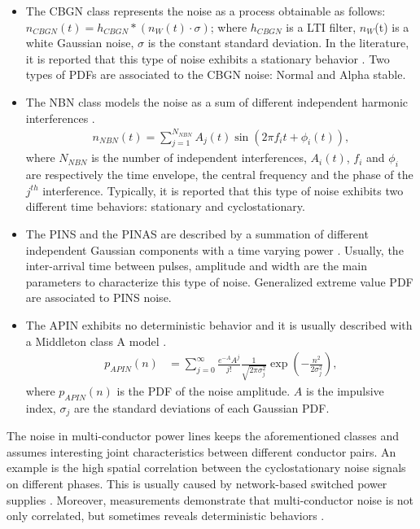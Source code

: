 \begin{itemize}

\item The CBGN class \cite{6288568} represents the noise as a process obtainable as follows: $n_{CBGN}(t) = h_{CBGN}* (n_W(t) \cdot \sigma)$;
where $h_{CBGN}$ is a LTI filter, $n_W$(t) is a white Gaussian noise, $\sigma$ is the constant standard deviation. In the literature, it is reported that this type of noise exhibits a stationary behavior \cite{1650328}. Two types of PDFs are associated to the CBGN noise: Normal and Alpha stable. 

\item The NBN class models the noise as a sum of different independent harmonic interferences \cite{5570980,7248409}. 
\begin{align}
n_{NBN}(t) = \sum_{j=1}^{N_{NBN}} A_j(t) \sin(2\pi f_it+\phi_i(t)),  
\label{eq:plc_nbn}
\end{align}
where $N_{NBN}$ is the number of independent interferences, $A_i(t)$, $f_i$ and $\phi_i$ are respectively the time envelope, the central frequency and the phase of the $j^{th}$ interference. 
Typically, it is reported that this type of noise exhibits two different time behaviors: stationary and cyclostationary. 

\item The PINS and the PINAS are described by a summation of different independent Gaussian components with a time varying power \cite{1650328,HanStoicaKaiser2016_1000056745}. Usually, the inter-arrival time between pulses, amplitude and width are the main parameters to characterize this type of noise. Generalized extreme value PDF are associated to PINS noise.

\item The APIN exhibits no deterministic behavior and it is usually described with a Middleton class A model \cite{4091283,6547827}. 
\begin{align}
p_{APIN}(n) &= \sum_{j=0}^{\infty} \frac{e^{-A}A^j}{j!} \frac{1}{\sqrt{2\pi \sigma^2_j}}\exp \left(-\frac{n^2}{2\sigma^2_j}\right),
\label{eq:plc_apin}
\end{align}
where $p_{APIN}(n)$ is the PDF of the noise amplitude. $A$ is the impulsive index, $\sigma_j$ are the standard deviations of each Gaussian PDF.
\end{itemize}

The noise in multi-conductor power lines keeps the aforementioned classes and assumes interesting joint characteristics between different conductor pairs. An example is the high spatial correlation between the cyclostationary noise signals on different phases. This is usually caused by network-based switched power supplies \cite{8245785}. Moreover, measurements demonstrate that multi-conductor noise is not only correlated, but sometimes reveals deterministic behaviors \cite{8360239}. 

